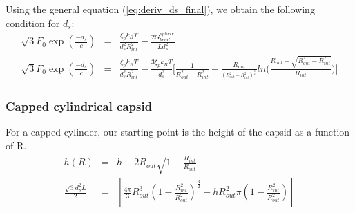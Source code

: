 \documentclass{article}
\begin{document}
Using the general equation (\ref{eq:deriv_ds_final}), we obtain the following condition for $d_s$:
\begin{eqnarray*}
\sqrt{3}F_0 \exp{ \left( \frac{-d_s}{c} \right)} &=& \frac{\xi_p k_B T}{d_s^2 R_{int}^2 } - \frac{2 G_{bend}^{sphere}}{Ld_s^2} \\
\sqrt{3}F_0 \exp{ \left( \frac{-d_s}{c} \right)} &=& \frac{\xi_p k_B T}{d_s^2 R_{int}^2 } - \frac{3\xi_p k_B T}{d_s^2}\bigg[\frac{1}{R_{out}^2 - R_{int}^2} + \frac{R_{out}}{^(R_{out}^2 - R_{int}^2)^\frac32}ln\bigg(\frac{R_{out} - \sqrt{R_{out}^2 - R_{int}^2}}{R_{int}}\bigg) \bigg]  
\end{eqnarray*}

\subsubsection*{Capped cylindrical capsid}
For a capped cylinder, our starting point is the height of the capsid as a function of R. 
\begin{eqnarray}
    h(R) &=& h + 2 R_{out} \sqrt{1 - \frac{R_{int}}{R_{out}}} \\
    \frac{\sqrt{3} d_s^2 L}{2} &=& \left[ \frac{4\pi}{3} R_{out}^3 \left( 1 - \frac{R_{int}^2}{R_{out}^2} \right)^\frac{3}{2} + h R_{out}^2 \pi \left( 1 - \frac{R_{int}^2}{R_{out}^2} \right) \right] \\
    
\end{eqnarray}
\end{document}
